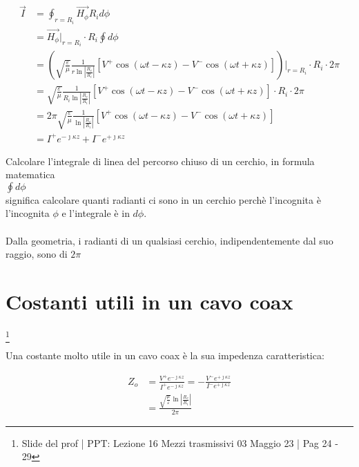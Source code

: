 {\Large \begin{equation}
    \begin{split}
        \vec{I} 
        &= \oint_{r = R_i} \vec{H_\phi} R_i d\phi \\
        &= \vec{H_\phi} \bigg|_{r = R_i} \cdot R_i \oint d\phi \\ 
        &= (\sqrt{\frac{\varepsilon}{\mu}} \frac{1}{r \ln \left|\frac{R_e}{R_i}\right|} [V^{+} \cos(\omega t - \kappa z) - V^{-} \cos(\omega t + \kappa z)]) \bigg|_{r = R_i} \cdot R_i \cdot 2\pi \\ 
        &= \sqrt{\frac{\varepsilon}{\mu}} \frac{1}{R_i \ln \left|\frac{R_e}{R_i}\right|} [V^{+} \cos(\omega t - \kappa z) - V^{-} \cos(\omega t + \kappa z)] \cdot R_i \cdot 2\pi \\ 
        &= 2\pi \sqrt{\frac{\varepsilon}{\mu}} \frac{1}{\ln \left|\frac{R_e}{R_i}\right|} [V^{+} \cos(\omega t - \kappa z) - V^{-} \cos(\omega t + \kappa z)] \\ 
        &=  I^{+} e^{- \jmath \kappa z} + I^{-} e^{+\jmath \kappa z}  
    \end{split}
\end{equation}} 

\begin{tcolorbox}
    Calcolare l'integrale di linea del percorso chiuso di un cerchio, in formula matematica \\ $\oint d\phi$ \\ 
    significa calcolare quanti radianti ci sono in un cerchio perchè l'incognita è 
    l'incognita $\phi$ e l'integrale è in $d\phi$. \\  \\ 
    Dalla geometria, i radianti di un qualsiasi cerchio, indipendentemente dal suo raggio, sono di $2 \pi$
\end{tcolorbox} 

\newpage 

\section{Costanti utili in un cavo coax} 

\footnote{Slide del prof | PPT: Lezione 16 Mezzi trasmissivi 03 Maggio 23 | Pag 24 - 29}

Una costante molto utile in un cavo coax  è la sua impedenza caratteristica: 

{\Large \begin{equation}
    \begin{split}
        Z_o 
        &= \frac{V^{+} e^{-\jmath \kappa z}}{I^{+} e^{-\jmath \kappa z}} = -\frac{V^{-} e^{+\jmath \kappa z}}{I^{-} e^{+\jmath \kappa z}} \\ 
        &= \frac{\sqrt{\frac{\mu}{\varepsilon}} \ln \left|\frac{R_e}{R_i}\right|}{2 \pi}
    \end{split}    
\end{equation}}

